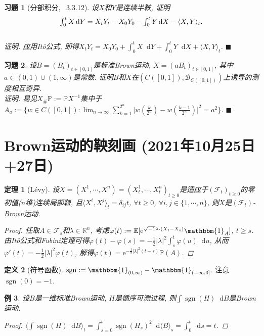 \documentclass{ctexart}
\theoremstyle{definition}
\newtheorem{Def}{定义}[section]
\theoremstyle{remark}
\theoremstyle{plain}
\newtheorem{Thm}[Def]{定理}
\newtheorem{Eg}[Def]{例}
\newtheorem{Ex}{习题}[section]
\newenvironment{Prf}{\vspace{1ex}\textbf{\\}{\color{red}\textit{证明}}.\normalfont}{\color{red}\hfill$\blacksquare$\vspace{1ex}\par}
\newcommand{\1}{\mathbbm{1}}				%
\newcommand{\as}{\mathrm{a.s.}}				%
\renewcommand{\P}{\mathbb{P}}				%
\newcommand{\E}{\mathbb{E}}					%
\newcommand{\agp}[1]{\langle #1 \rangle}	%
\newcommand{\sgn}[1]{\operatorname{sgn}(#1)}	%
\newcommand{\abs}[1]{\lvert#1\rvert}			%
\newcommand{\R}{\mathbb{R}}					%
\newcommand{\tint}{\textstyle\int\nolimits}
\renewcommand*{\d}{\mathop{}\!\mathrm{d}}	%
\newcommand{\e}{\mathrm{e}}
\begin{document}
\begin{Ex}[分部积分, \cite{Karatzas-Shreve--GTM113}~3.3.12]
设$X$和$Y$是连续半鞅, 证明
\[ \tint_{0}^{t} X \d Y = X_{t}Y_{t}-X_{0}Y_{0} - \int_{0}^{t} Y \d X - \agp{X,Y}_{t} . \vspace{-4.5ex}\]
\begin{Prf}
应用It\^{o}公式, 即得$X_{t}Y_{t} = X_{0}Y_{0} + \int_{0}^{t} X \d Y + \int_{0}^{t} Y \d X + \agp{X,Y}_{t}$.
\end{Prf}
\end{Ex}


\begin{Ex}
设$B = (B_{t})_{t\in[0,1]}$是标准Brown运动, $X = (aB_{t})_{t\in[0,1]}$, 其中$a \in (0,1) \cup (1,\infty)$是常数. 证明$B$和$X$在$(C([0, 1]),\mathscr{B}_{C([0, 1])})$上诱导的测度相互奇异.
\begin{Prf}
易见$X_{\#}\P := \P X^{-1}$集中于$A_{a} := \{ w \in C([0,1]) : \lim_{n\to\infty}\sum_{k=1}^{2^n}\abs{w(\frac{k}{2^{n}})-w(\frac{k-1}{2^{n}})}^{2} = a^{2} \}$.
\end{Prf}
\end{Ex}



\section{Brown运动的鞅刻画 \normalfont\footnotesize (2021年10月25日+27日)}
\begin{Thm}[L\'{e}vy]
设$X = (X^{1},\cdots,X^{n}) = (X^{1}_{t},\cdots,X^{n}_{t})_{t \ge 0}$是适应于$(\mathscr{F}_{t})_{t \ge 0}$的零初值($n$维)连续局部鞅, 且$\agp{X^{i},X^{j}}_{t} = \delta_{ij}t$, $\forall t \ge 0$, $\forall i,j \in \{1,\cdots,n\}$, 则$X$是$(\mathscr{F}_{t})$-Brown运动.
\begin{proof}
任取$A \in \mathscr{F}_{s}$和$\lambda \in \R^n$, 考虑$\varphi(t) := \E[\e^{\sqrt{-1}\lambda\bm{\cdot}(X_{t}-X_{s})}\1_{A}]$, $t \ge s$. 由It\^{o}公式和Fubini定理可得$\varphi(t) - \varphi(s) = -\frac{1}{2}\abs{\lambda}^{2} \int_{s}^{t} \varphi(u) \d u$, 从而$\varphi'(t) = -\frac{1}{2}\abs{\lambda}^{2} \varphi(t)$, 解得$\varphi(t) = \e^{-\frac{1}{2}\abs{\lambda}^{2}(t-s)} \P(A)$.
\end{proof}
\end{Thm}

\begin{Def}[符号函数]
$\text{sgn} := \1_{(0,\infty)} - \1_{(-\infty,0]}$. 注意$\sgn{0} = -1$.
\end{Def}
\begin{Eg}\label{Eg:sgn_BM}
设$B$是一维标准Brown运动, $H$是循序可测过程, 则$\int \sgn{H} \d B$是Brown运动.
\begin{proof}
$\agp{\int \sgn{H} \d B}_{t} = \int_{s=0}^{t} \sgn{H_{s}}^{2} \d \agp{B}_{s} = \int_{0}^{t} \d s = t$.
\end{proof}
\end{Eg}
\end{document}
